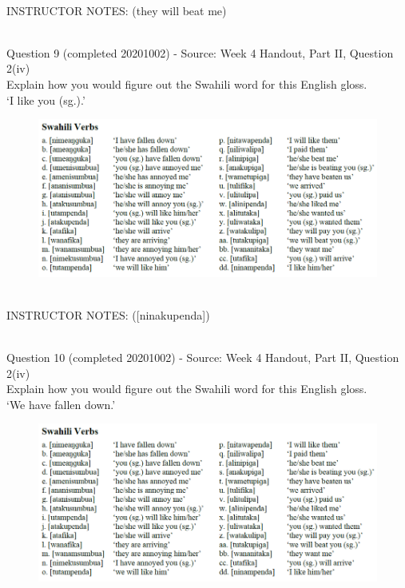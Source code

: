 \documentclass[12pt]{article}
\begin{document}
~\\
INSTRUCTOR NOTES: (they will beat me)


~\\

{\large Question 9} (completed 20201002) - Source: Week 4 Handout, Part II, Question 2(iv)\\

Explain how you would figure out the Swahili word for this English gloss.\\

‘I like you (sg.).’

\begin{figure}[H]
\includegraphics{../images/swahiliverbs.png}
\end{figure}

~\\
INSTRUCTOR NOTES: ([ninakupenda])


~\\

{\large Question 10} (completed 20201002) - Source: Week 4 Handout, Part II, Question 2(iv)\\

Explain how you would figure out the Swahili word for this English gloss.\\

‘We have fallen down.’

\begin{figure}[H]
\includegraphics{../images/swahiliverbs.png}
\end{figure}
\end{document}
